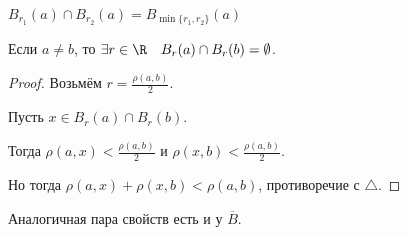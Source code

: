 \begin{properties} \thmslashn

    $B_{r_1}(a)\cap B_{r_2}(a) = B_{\min \{r_1, r_2\} }(a)$ 

    Если $a \neq b$, то $\exists{r\in \R}\quad B_{r}(a)\cap B_{r}(b) = \emptyset$.
    \begin{proof} \thmslashn
    
        Возьмём $r = \frac{\rho(a, b)}{2}$.

        Пусть $x\in B_{r}(a)\cap B_{r}(b)$.

        Тогда $\rho(a, x) < \frac{\rho(a, b)}{2}$ и $\rho(x, b) < \frac{\rho(a, b)}{2}$.

        Но тогда $\rho(a, x) + \rho(x, b) < \rho(a, b)$, противоречие с $\triangle$.
    \end{proof}

    Аналогичная пара свойств есть и у $\overline{B}$.
\end{properties}
